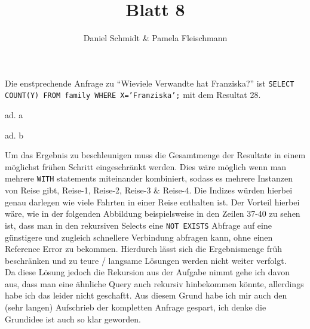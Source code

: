 \documentclass[12pt,a4paper]{amsart}
\begin{document}
\title{Blatt 8}

\author{Daniel Schmidt \& Pamela Fleischmann}

\maketitle

\begin{aufgabe1}


Die enstprechende Anfrage zu ``Wieviele Verwandte hat Franziska?'' ist \texttt{SELECT COUNT(Y) FROM family WHERE X='Franziska';} mit dem Resultat 28.
\end{aufgabe1}


\begin{aufgabe1}
ad. a



ad. b

Um das Ergebnis zu beschleunigen muss die Gesamtmenge der Resultate in einem möglichst frühen Schritt eingeschränkt werden. Dies wäre möglich wenn man mehrere \texttt{WITH} statements miteinander kombiniert, sodass es mehrere Instanzen von Reise gibt, Reise-1, Reise-2, Reise-3 \& Reise-4. Die Indizes würden hierbei genau darlegen wie viele Fahrten in einer Reise enthalten ist. Der Vorteil hierbei wäre, wie in der folgenden Abbildung beispielsweise in den Zeilen 37-40 zu sehen ist, dass man in den rekursiven Selects eine \texttt{NOT EXISTS} Abfrage auf eine günstigere und zugleich schnellere Verbindung abfragen kann, ohne einen Reference Error zu bekommen. Hierdurch lässt sich die Ergebnismenge früh beschränken und zu teure / langsame Lösungen werden nicht weiter verfolgt.  \\



Da diese Lösung jedoch die Rekursion aus der Aufgabe nimmt gehe ich davon aus, dass man eine ähnliche Query auch rekursiv hinbekommen könnte, allerdings habe ich das leider nicht geschaftt. Aus diesem Grund habe ich mir auch den (sehr langen) Aufschrieb der kompletten Anfrage gespart, ich denke die Grundidee ist auch so klar geworden.



\end{aufgabe1}
\end{document}
